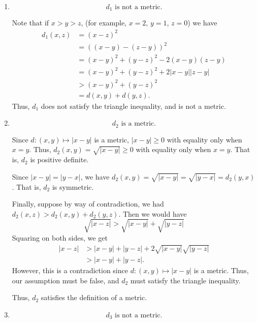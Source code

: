 \documentclass[12 pt, letterpaper]{hmcpset}
\begin{document}
\begin{solution}
	\begin{enumerate}[label = (\arabic*)]
		\item
			\[
				\boxed{
					d_{1} \text{ is not a metric}.
				}
			\]

			Note that if $x > y > z$, (for example, $x = 2$, $y = 1$, $z = 0$) we have
			\[
				\begin{split}
					d_{1}(x, z) & = (x - z)^{2} \\
						    & = ((x - y) - (z - y))^{2} \\
						    & = (x - y)^{2} + (y - z)^{2} - 2(x - y)(z - y) \\
						    & = (x - y)^{2} + (y - z)^{2} + 2 \lvert x - y \rvert \lvert z - y \rvert \\
						    & >(x - y)^{2} + (y - z)^{2} \\
						    & = d(x, y) + d(y, z).
				\end{split}
			\]
			Thus, $d_{1}$ does not satisfy the triangle inequality, and is not a metric.
		\item
			\[
				\boxed{
					d_{2} \text{ is a metric}.
				}
			\]

			Since $d : (x, y) \mapsto \lvert x - y \rvert$ is a metric, $\lvert x - y \rvert \ge 0$ with equality only when $x = y$. Thus, $d_{2}(x, y) = \sqrt{\lvert x - y \rvert} \ge 0$ with equality only when $x = y$. That is, $d_{2}$ is positive definite.

			Since $\lvert x - y \rvert = \lvert y - x \rvert$, we have $d_{2}(x, y) = \sqrt{\lvert x - y \rvert} = \sqrt{\lvert y - x \rvert} = d_{2}(y, x)$. That is, $d_{2}$ is symmetric.

			Finally, suppose by way of contradiction, we had  $d_{2}(x, z) > d_{2}(x, y) + d_{2}(y, z)$. Then we would have 
			\[
				\sqrt{\lvert x - z \rvert} > \sqrt{\lvert x - y \rvert} + \sqrt{\lvert y - z \rvert}
			\]
			Squaring on both sides, we get
			\[
				\begin{split}
					\lvert x - z \rvert & > \lvert x - y \rvert + \lvert y - z \rvert + 2 \sqrt{\lvert x - y \rvert} \sqrt{\lvert y - z \rvert} \\
							    & > \lvert x - y \rvert + \lvert y - z \rvert.
				\end{split}
			\]
			However, this is a contradiction since $d : (x, y) \mapsto \lvert x - y \rvert$ is a metric. Thus, our assumption must be false, and $d_{2}$ must satisfy the triangle inequality.

			Thus, $d_{2}$ satisfies the definition of a metric.
		\item
			\[
				\boxed{
					d_{3} \text{ is not a metric}.
				}
			\]


\end{enumerate}
\end{solution}
\end{document}
